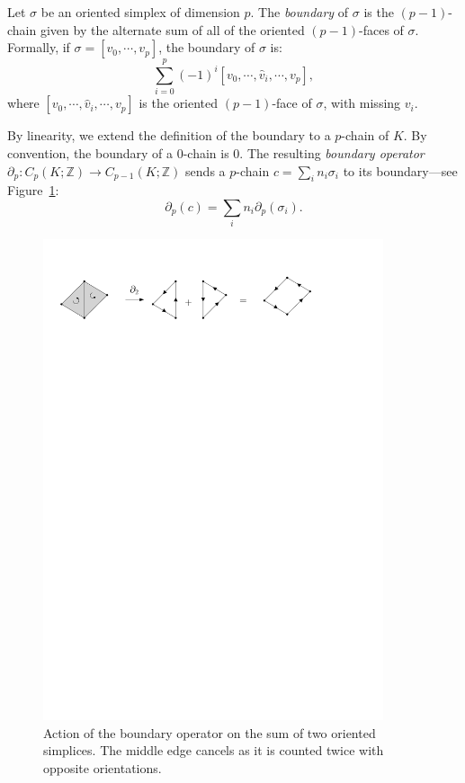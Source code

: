 \begin{defin} 
Let $\sigma$ be an oriented simplex of dimension $p$. 
The {\em boundary} of $\sigma$ is the $(p-1)$-chain given by the alternate 
sum of all of the oriented $(p-1)$-faces of $\sigma$. 
Formally, if $\sigma=[v_{0},\cdots,v_{p}]$, the boundary of $\sigma$ is: 
$$\sum_{i=0}^{p}(-1)^{i}[v_{0},\cdots,\hat{v}_{i},\cdots,v_{p}],$$ 
where $[v_{0},\cdots,\hat{v}_{i},\cdots,v_{p}]$ is the oriented $(p-1)$-face of $\sigma$, with missing $v_{i}$.
\end{defin}

By linearity, we extend the definition of the boundary to a $p$-chain of $K$. 
By convention, the boundary of a 0-chain is 0. The resulting 
{\em boundary operator} $\partial_{p}:C_{p}(K;\mathbb{Z})\rightarrow C_{p-1}(K;\mathbb{Z})$ 
sends a $p$-chain $c=\sum_{i}n_{i}\sigma_{i}$ to its boundary---see Figure~\ref{fig:bound}: 
$$\partial_{p}(c)=\sum_{i}n_{i}\partial_{p}(\sigma_{i}).$$ 

\begin{figure}[h]\centering 
\includegraphics[width = 10cm]{figures/BoundaryOperator} 
\caption[Boundary operator]{\label{fig:bound} Action of the boundary operator on the sum of two oriented simplices. 
The middle edge cancels as it is counted twice with opposite orientations.} 
\end{figure}

